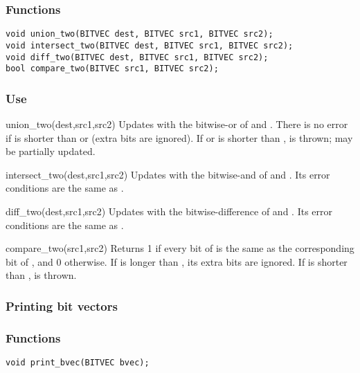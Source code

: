 \subsubsection*{Functions}
\begin{verbatim}
void union_two(BITVEC dest, BITVEC src1, BITVEC src2);
void intersect_two(BITVEC dest, BITVEC src1, BITVEC src2);
void diff_two(BITVEC dest, BITVEC src1, BITVEC src2);
bool compare_two(BITVEC src1, BITVEC src2);
\end{verbatim}

\subsubsection*{Use}

\begin{defun}{union_two}{(dest,src1,src2)}
Updates  with the bitwise-or of  and .
There is no error if  is shorter than  or
 (extra bits are ignored).  If  or 
is shorter than ,  is thrown;
 may be partially updated.
\end{defun}

\begin{defun}{intersect_two}{(dest,src1,src2)}
Updates  with the bitwise-and of  and .
Its error conditions are the same as .
\end{defun}

\begin{defun}{diff_two}{(dest,src1,src2)}
Updates  with the bitwise-difference of  and
.  Its error conditions are the same as .
\end{defun}

\begin{defun}{compare_two}{(src1,src2)}
Returns 1 if every bit of
 is the same as the corresponding bit of , and 0
otherwise.  If  is longer than , its extra bits are
ignored.  If  is shorter than ,
 is thrown.
\end{defun}

\subsubsection*{Printing bit vectors}

\subsubsection*{Functions}
\begin{verbatim}
void print_bvec(BITVEC bvec);
\end{verbatim}

